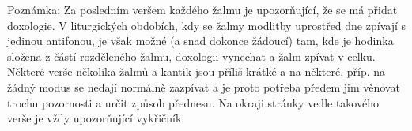 \documentclass[a5paper, twoside]{article}
\newenvironment{hora}{
  \begin{multicols}{2}
}{
  \end{multicols}
}
\begin{document}
\pagestyle{empty}
\titulniStrankaSvazkuAntifonare

Poznámka: Za posledním veršem každého žalmu je  u\-po\-zor\-ňu\-jí\-cí,
že se má přidat doxologie. V liturgických obdobích, kdy se žalmy modlitby uprostřed
dne zpívají s jedinou antifonou, je však možné (a snad dokonce žádoucí)
tam, kde je hodinka složena z částí
rozděleného žalmu, doxologii vynechat a žalm zpívat v celku.\\

Některé verše několika žalmů a kantik jsou příliš krátké a na některé,
příp. na žádný modus se nedají normálně zazpívat a je proto potřeba
předem jim věnovat trochu pozornosti a určit způsob přednesu.
Na okraji stránky vedle takového verše je vždy upozorňující vykřičník.
\newpage

\setlength{\columnseprule}{1pt} %
\setlength{\columnsep}{20pt} %


\fancyhead{}
\fancyhead[LE,RO]{\thepage}
\fancyfoot{}

\pagestyle{fancy}


\begin{hora}

\columnbreak

\end{hora}

\end{document}

